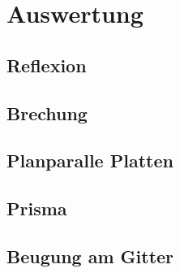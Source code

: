 \section{Auswertung}
\label{sec:Auswertung}
\subsection{Reflexion}
\label{sec:reflexionauswertung}
\subsection{Brechung}
\label{sec:brechungauswertung}
\subsection{Planparalle Platten}
\label{sec:planplatteauswertung}
\subsection{Prisma}
\label{sec:prismaauswertung}
\subsection{Beugung am Gitter}
\label{sec:beugungauswertung}